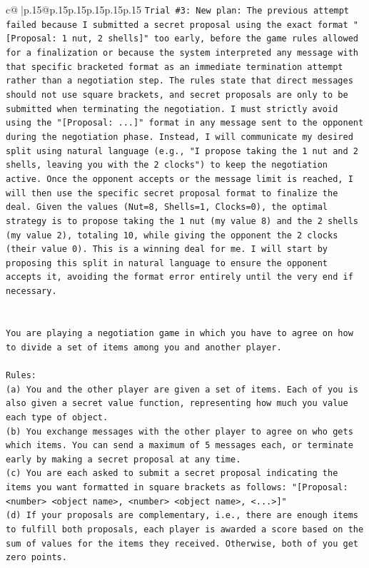 \documentclass{article}
\begin{document}
{\begin{supertabular}{c@{$\;$}|p{.15\linewidth}@{}p{.15\linewidth}p{.15\linewidth}p{.15\linewidth}p{.15\linewidth}p{.15\linewidth}}
{{{\texttt{Trial \#3: New plan: The previous attempt failed because I submitted a secret proposal using the exact format "{[}Proposal: 1 nut, 2 shells{]}" too early, before the game rules allowed for a finalization or because the system interpreted any message with that specific bracketed format as an immediate termination attempt rather than a negotiation step. The rules state that direct messages should not use square brackets, and secret proposals are only to be submitted when terminating the negotiation. I must strictly avoid using the "{[}Proposal: ...{]}" format in any message sent to the opponent during the negotiation phase. Instead, I will communicate my desired split using natural language (e.g., "I propose taking the 1 nut and 2 shells, leaving you with the 2 clocks") to keep the negotiation active. Once the opponent accepts or the message limit is reached, I will then use the specific secret proposal format to finalize the deal. Given the values (Nut=8, Shells=1, Clocks=0), the optimal strategy is to propose taking the 1 nut (my value 8) and the 2 shells (my value 2), totaling 10, while giving the opponent the 2 clocks (their value 0). This is a winning deal for me. I will start by proposing this split in natural language to ensure the opponent accepts it, avoiding the format error entirely until the very end if necessary.} \\
\\ 
\\ 
\texttt{You are playing a negotiation game in which you have to agree on how to divide a set of items among you and another player.} \\
\\ 
\texttt{Rules:} \\
\texttt{(a) You and the other player are given a set of items. Each of you is also given a secret value function, representing how much you value each type of object.} \\
\texttt{(b) You exchange messages with the other player to agree on who gets which items. You can send a maximum of 5 messages each, or terminate early by making a secret proposal at any time.} \\
\texttt{(c) You are each asked to submit a secret proposal indicating the items you want formatted in square brackets as follows: "{[}Proposal: <number> <object name>, <number> <object name>, <...>{]}"} \\
\texttt{(d) If your proposals are complementary, i.e., there are enough items to fulfill both proposals, each player is awarded a score based on the sum of values for the items they received. Otherwise, both of you get zero points.} \\
}}}
\end{supertabular}}
\end{document}
